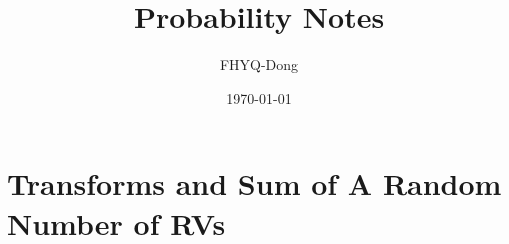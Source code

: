 \documentclass[device=normal, lang=en]{elegantbook}
\title{Probability Notes}
\author{FHYQ-Dong}
\date{\today}
\numberwithin{equation}{section}
\begin{document}
\maketitle
\frontmatter

\tableofcontents
\mainmatter













\chapter{Transforms and Sum of A Random Number of RVs}
\end{document}
